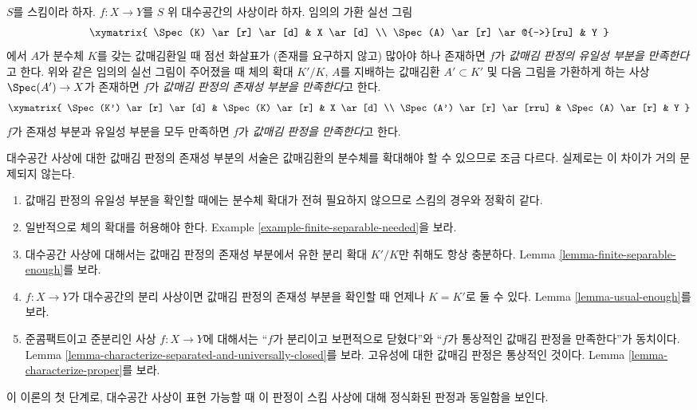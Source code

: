 \begin{definition}
\label{definition-valuative-criterion}
$S$를 스킴이라 하자.
$f : X \to Y$를 $S$ 위 대수공간의 사상이라 하자.
임의의 가환 실선 그림
$$
\xymatrix{
\Spec(K) \ar[r] \ar[d] & X \ar[d] \\
\Spec(A) \ar[r] \ar@{-->}[ru] & Y
}
$$
에서 $A$가 분수체 $K$를 갖는 값매김환일 때 점선 화살표가
(존재를 요구하지 않고) 많아야 하나 존재하면 $f$가
{\it 값매김 판정의 유일성 부분을 만족한다}고 한다.
위와 같은 임의의 실선 그림이 주어졌을 때 체의 확대 $K'/K$,
$A$를 지배하는 값매김환 $A' \subset K'$ 및 다음 그림을 가환하게 하는
사상 $\Spec(A') \to X$가 존재하면 $f$가
{\it 값매김 판정의 존재성 부분을 만족한다}고 한다.
$$
\xymatrix{
\Spec(K') \ar[r] \ar[d] & \Spec(K) \ar[r] & X \ar[d] \\
\Spec(A') \ar[r] \ar[rru] & \Spec(A) \ar[r] & Y
}
$$
$f$가 존재성 부분과 유일성 부분을 모두 만족하면
$f$가 {\it 값매김 판정을 만족한다}고 한다.
\end{definition}

\noindent
대수공간 사상에 대한 값매김 판정의 존재성 부분의 서술은
값매김환의 분수체를 확대해야 할 수 있으므로 조금 다르다.
실제로는 이 차이가 거의 문제되지 않는다.
\begin{enumerate}
\item 값매김 판정의 유일성 부분을 확인할 때에는 분수체 확대가 전혀 필요하지
않으므로 스킴의 경우와 정확히 같다.
\item 일반적으로 체의 확대를 허용해야 한다. Example
\ref{example-finite-separable-needed}을 보라.
\item 대수공간 사상에 대해서는 값매김 판정의 존재성 부분에서
유한 분리 확대 $K'/K$만 취해도 항상 충분하다. Lemma
\ref{lemma-finite-separable-enough}를 보라.
\item $f : X \to Y$가 대수공간의 분리 사상이면 값매김 판정의 존재성 부분을
확인할 때 언제나 $K = K'$로 둘 수 있다. Lemma
\ref{lemma-usual-enough}를 보라.
\item 준콤팩트이고 준분리인 사상 $f : X \to Y$에 대해서는
“$f$가 분리이고 보편적으로 닫혔다”와
“$f$가 통상적인 값매김 판정을 만족한다”가 동치이다. Lemma
\ref{lemma-characterize-separated-and-universally-closed}를 보라.
고유성에 대한 값매김 판정은 통상적인 것이다. Lemma
\ref{lemma-characterize-proper}를 보라.
\end{enumerate}
이 이론의 첫 단계로, 대수공간 사상이 표현 가능할 때 이 판정이
스킴 사상에 대해 정식화된 판정과 동일함을 보인다.

